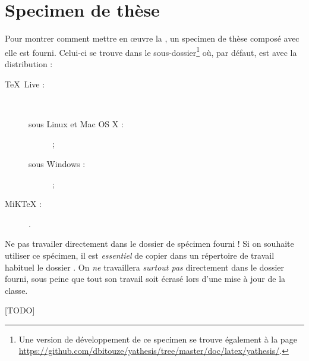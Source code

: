 \chapter{Specimen de thèse}\label{cha:specimen}

Pour montrer comment mettre en œuvre la \yatcl, un specimen de thèse composé
avec elle est fourni.  Celui-ci se trouve dans le sous-dossier\footnote{Une
  version de développement de ce specimen se trouve également à la page
  \url{https://github.com/dbitouze/yathesis/tree/master/doc/latex/yathesis/}.}
 où, par défaut, 
est avec la distribution :
\begin{description}
\item[\TeX{}~Live :]\
  \begin{description}
  \item[sous Linux et Mac OS X :] \unixtldirectory\tldistdirectory\versiontl ;
  \item[sous Windows :] \wintldirectory\tldistdirectory\versiontl ;
  \end{description}
\item[MiK\TeX{} :] \miktexdistdirectory.
\end{description}

\begin{dbwarning}{Ne pas travailer directement dans le dossier de spécimen
    fourni !}{}
  Si on souhaite utiliser ce spécimen, il est \emph{essentiel} de copier dans
  un répertoire de travail habituel le dossier \directory{sample}. On \emph{ne}
  travaillera \emph{surtout pas} directement dans le dossier fourni, sous peine
  que tout son travail soit écrasé lors d'une mise à jour de la classe.
\end{dbwarning}


[TODO]

%
\iffalse
\fi
